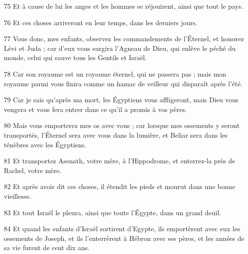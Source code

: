 \par 75 Et à cause de lui les anges et les hommes se réjouirent, ainsi que tout le pays.

\par 76 Et ces choses arriveront en leur temps, dans les derniers jours.

\par 77 Vous donc, mes enfants, observez les commandements de l'Éternel, et honorez Lévi et Juda ; car d'eux vous surgira l'Agneau de Dieu, qui enlève le péché du monde, celui qui sauve tous les Gentils et Israël.

\par 78 Car son royaume est un royaume éternel, qui ne passera pas ; mais mon royaume parmi vous finira comme un hamac de veilleur qui disparaît après l'été.

\par 79 Car je sais qu'après ma mort, les Égyptiens vous affligeront, mais Dieu vous vengera et vous fera entrer dans ce qu'il a promis à vos pères.

\par 80 Mais vous emporterez mes os avec vous ; car lorsque mes ossements y seront transportés, l'Éternel sera avec vous dans la lumière, et Beliar sera dans les ténèbres avec les Égyptiens.

\par 81 Et transportez Asenath, votre mère, à l'Hippodrome, et enterrez-la près de Rachel, votre mère.

\par 82 Et après avoir dit ces choses, il étendit les pieds et mourut dans une bonne vieillesse.

\par 83 Et tout Israël le pleura, ainsi que toute l'Égypte, dans un grand deuil.

\par 84 Et quand les enfants d'Israël sortirent d'Egypte, ils emportèrent avec eux les ossements de Joseph, et ils l'enterrèrent à Hébron avec ses pères, et les années de sa vie furent de cent dix ans.






